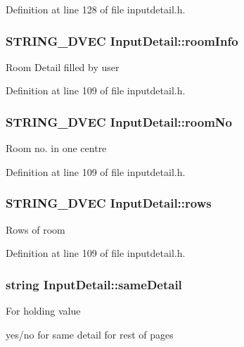 Definition at line 128 of file inputdetail.\-h.

\hypertarget{classInputDetail_a7472fa615f318a2553b750529c3a4b0e}{
\subsubsection[{room\-Info}]{\setlength{\rightskip}{0pt plus 5cm}S\-T\-R\-I\-N\-G\-\_\-D\-V\-E\-C Input\-Detail\-::room\-Info\hspace{0.3cm}{\ttfamily [protected]}}}\label{classInputDetail_a7472fa615f318a2553b750529c3a4b0e}
Room Detail filled by user 

Definition at line 109 of file inputdetail.\-h.

\hypertarget{classInputDetail_a3193354764ba0b44b2eb4b366b4c273a}{
\subsubsection[{room\-No}]{\setlength{\rightskip}{0pt plus 5cm}S\-T\-R\-I\-N\-G\-\_\-D\-V\-E\-C Input\-Detail\-::room\-No\hspace{0.3cm}{\ttfamily [protected]}}}\label{classInputDetail_a3193354764ba0b44b2eb4b366b4c273a}
Room no. in one centre 

Definition at line 109 of file inputdetail.\-h.

\hypertarget{classInputDetail_aa203edbcfd4083624dbc4dc055c1e6e5}{
\subsubsection[{rows}]{\setlength{\rightskip}{0pt plus 5cm}S\-T\-R\-I\-N\-G\-\_\-D\-V\-E\-C Input\-Detail\-::rows\hspace{0.3cm}{\ttfamily [protected]}}}\label{classInputDetail_aa203edbcfd4083624dbc4dc055c1e6e5}
Rows of room 

Definition at line 109 of file inputdetail.\-h.

\hypertarget{classInputDetail_a13313d76b2ccc308634a7d802a46936a}{
\subsubsection[{same\-Detail}]{\setlength{\rightskip}{0pt plus 5cm}string Input\-Detail\-::same\-Detail\hspace{0.3cm}{\ttfamily [protected]}}}\label{classInputDetail_a13313d76b2ccc308634a7d802a46936a}
\begin{DoxyVerb}                           For holding value
\end{DoxyVerb}
 yes/no for same detail for rest of pages 


